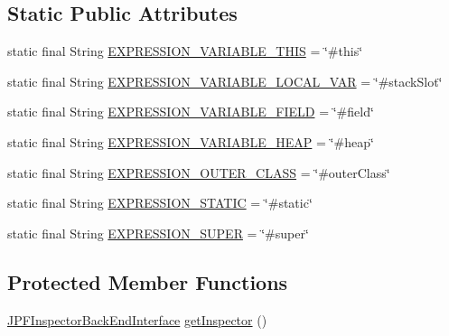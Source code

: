 \subsection*{Static Public Attributes}
\begin{DoxyCompactItemize}
\item 
static final String \hyperlink{classgov_1_1nasa_1_1jpf_1_1inspector_1_1common_1_1pse_1_1_p_s_e_variable_af8959a7765f3dfb003455c21f541f7f1}{E\+X\+P\+R\+E\+S\+S\+I\+O\+N\+\_\+\+V\+A\+R\+I\+A\+B\+L\+E\+\_\+\+T\+H\+IS} = \char`\"{}\#this\char`\"{}
\item 
static final String \hyperlink{classgov_1_1nasa_1_1jpf_1_1inspector_1_1common_1_1pse_1_1_p_s_e_variable_a16e15f6de4b00d41b48ba8a53907442d}{E\+X\+P\+R\+E\+S\+S\+I\+O\+N\+\_\+\+V\+A\+R\+I\+A\+B\+L\+E\+\_\+\+L\+O\+C\+A\+L\+\_\+\+V\+AR} = \char`\"{}\#stack\+Slot\char`\"{}
\item 
static final String \hyperlink{classgov_1_1nasa_1_1jpf_1_1inspector_1_1common_1_1pse_1_1_p_s_e_variable_ab3f12265123f287c0404aa928152edc4}{E\+X\+P\+R\+E\+S\+S\+I\+O\+N\+\_\+\+V\+A\+R\+I\+A\+B\+L\+E\+\_\+\+F\+I\+E\+LD} = \char`\"{}\#field\char`\"{}
\item 
static final String \hyperlink{classgov_1_1nasa_1_1jpf_1_1inspector_1_1common_1_1pse_1_1_p_s_e_variable_a65ca865249b5324ab8b1c93773774c49}{E\+X\+P\+R\+E\+S\+S\+I\+O\+N\+\_\+\+V\+A\+R\+I\+A\+B\+L\+E\+\_\+\+H\+E\+AP} = \char`\"{}\#heap\char`\"{}
\item 
static final String \hyperlink{classgov_1_1nasa_1_1jpf_1_1inspector_1_1common_1_1pse_1_1_p_s_e_variable_a0353bceb87ab57d70c3466df4f153c6a}{E\+X\+P\+R\+E\+S\+S\+I\+O\+N\+\_\+\+O\+U\+T\+E\+R\+\_\+\+C\+L\+A\+SS} = \char`\"{}\#outer\+Class\char`\"{}
\item 
static final String \hyperlink{classgov_1_1nasa_1_1jpf_1_1inspector_1_1common_1_1pse_1_1_p_s_e_variable_a633058c65be360292bd37c068ef5a4ce}{E\+X\+P\+R\+E\+S\+S\+I\+O\+N\+\_\+\+S\+T\+A\+T\+IC} = \char`\"{}\#static\char`\"{}
\item 
static final String \hyperlink{classgov_1_1nasa_1_1jpf_1_1inspector_1_1common_1_1pse_1_1_p_s_e_variable_a50ddc6bebf28a3d4493b7214976a61ff}{E\+X\+P\+R\+E\+S\+S\+I\+O\+N\+\_\+\+S\+U\+P\+ER} = \char`\"{}\#super\char`\"{}
\end{DoxyCompactItemize}
\subsection*{Protected Member Functions}
\begin{DoxyCompactItemize}
\item 
\hyperlink{interfacegov_1_1nasa_1_1jpf_1_1inspector_1_1interfaces_1_1_j_p_f_inspector_back_end_interface}{J\+P\+F\+Inspector\+Back\+End\+Interface} \hyperlink{classgov_1_1nasa_1_1jpf_1_1inspector_1_1common_1_1pse_1_1_program_state_entry_ab04eadea7420b70405969a6b95656411}{get\+Inspector} ()
\end{DoxyCompactItemize}
